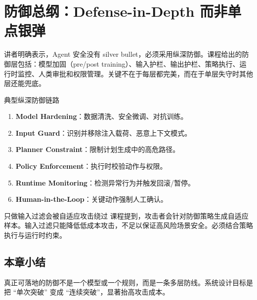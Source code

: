 \section{防御总纲：Defense-in-Depth 而非单点银弹}

讲者明确表示，Agent 安全没有 silver bullet，必须采用纵深防御。课程给出的防御层包括：模型加固（pre/post training）、输入护栏、输出护栏、策略执行、运行时监控、人类审批和权限管理。关键不在于每层都完美，而在于单层失守时其他层还能兜底。

\begin{knowledgebox}{典型纵深防御链路}
\begin{enumerate}
    \item \textbf{Model Hardening}：数据清洗、安全微调、对抗训练。
    \item \textbf{Input Guard}：识别并移除注入载荷、恶意上下文模式。
    \item \textbf{Planner Constraint}：限制计划生成中的高危路径。
    \item \textbf{Policy Enforcement}：执行时校验动作与权限。
    \item \textbf{Runtime Monitoring}：检测异常行为并触发回滚/暂停。
    \item \textbf{Human-in-the-Loop}：关键动作强制人工确认。
\end{enumerate}
\end{knowledgebox}

\begin{warningbox}{只做输入过滤会被自适应攻击绕过}
课程提到，攻击者会针对防御策略生成自适应样本。输入过滤只能降低低成本攻击，不足以保证高风险场景安全。必须结合策略执行与运行时约束。
\end{warningbox}

\subsection{本章小结}
真正可落地的防御不是一个模型或一个规则，而是一条多层防线。系统设计目标是把 ``单次突破'' 变成 ``连续突破''，显著抬高攻击成本。

